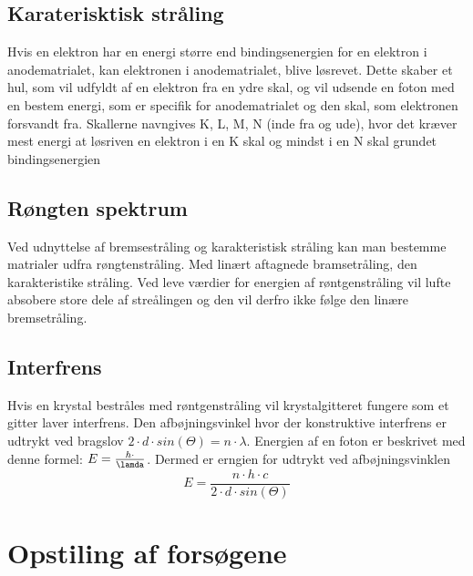 \documentclass[a4paper,twoside]{article}
\begin{document}
\subsection{Karaterisktisk stråling}
Hvis en elektron har en energi større end bindingsenergien for en elektron i anodematrialet, kan elektronen i anodematrialet, blive løsrevet. Dette skaber et hul, som vil udfyldt af en elektron fra en ydre skal, og vil udsende en foton med en bestem energi, som er specifik for anodematrialet og den skal, som elektronen forsvandt fra. Skallerne navngives K, L, M, N (inde fra og ude), hvor det kræver mest energi at løsriven en elektron i en K skal og mindst i en N skal grundet bindingsenergien

\subsection{Røngten spektrum}
Ved udnyttelse af bremsestråling og karakteristisk stråling kan man bestemme matrialer udfra røngtenstråling. Med linært aftagnede bramsetråling, den karakteristike stråling. Ved leve værdier for energien af røntgenstråling vil lufte absobere store dele af streålingen og den vil derfro ikke følge den linære bremsetråling.

\subsection{Interfrens}
Hvis en krystal bestråles med røntgenstråling vil krystalgitteret fungere som et gitter laver interfrens. Den afbøjningsvinkel hvor der konstruktive interfrens er udtrykt ved bragslov $2\cdot d \cdot sin(\Theta)=n\cdot \lambda$. Energien af en foton er beskrivet med denne formel: $E=\frac{h\cdot}{\lamda}$. Dermed er erngien for udtrykt ved afbøjningsvinklen 
\begin{equation}
    E=\frac{n\cdot h\cdot c}{2\cdot d\cdot sin(\Theta)}
\end{equation}


\section{Opstiling af forsøgene}
\end{document}

